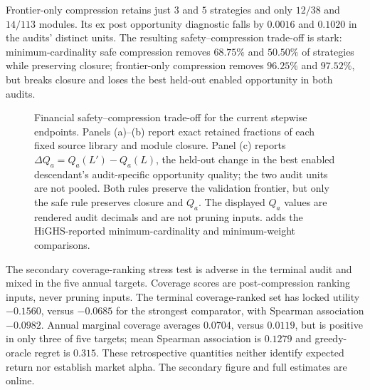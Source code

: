 Frontier-only compression retains just $3$ and $5$ strategies and only
$12/38$ and $14/113$ modules.  Its ex post opportunity diagnostic falls by
$0.0016$ and $0.1020$ in the audits' distinct units.  The resulting
safety--compression trade-off is stark: minimum-cardinality safe compression
removes $68.75\%$ and $50.50\%$ of strategies while preserving closure;
frontier-only compression removes $96.25\%$ and $97.52\%$, but breaks
closure and loses the best held-out enabled opportunity in both audits.

\begin{figure}[htbp]
  \centering
  
  \caption{Financial safety--compression trade-off for the current stepwise
  endpoints.  Panels (a)--(b) report exact retained fractions of each fixed
  source library and module closure.  Panel (c) reports
  \(\Delta Q_a=Q_a(L')-Q_a(L)\), the held-out change in the best enabled
  descendant's audit-specific opportunity quality; the two audit units are
  not pooled.  Both rules preserve the validation frontier, but only the safe
  rule preserves closure and \(Q_a\).  The displayed \(Q_a\) values are
  rendered audit decimals and are not pruning inputs.  
  adds the HiGHS-reported minimum-cardinality and minimum-weight comparisons.}
  \label{fig:financial-safe-compression}
\end{figure}

\FloatBarrier
The secondary coverage-ranking stress test is adverse in the terminal audit
and mixed in the five annual targets.
Coverage scores are post-compression ranking inputs, never pruning inputs.
The terminal coverage-ranked set has
locked utility $-0.1560$, versus $-0.0685$ for the strongest comparator,
with Spearman association $-0.0982$.  Annual marginal coverage averages
$0.0704$, versus $0.0119$, but is positive in only three of five targets;
mean Spearman association is $0.1279$ and greedy-oracle regret is $0.315$.
These retrospective quantities neither identify expected return nor establish
market alpha.  The secondary figure and full estimates are online.
